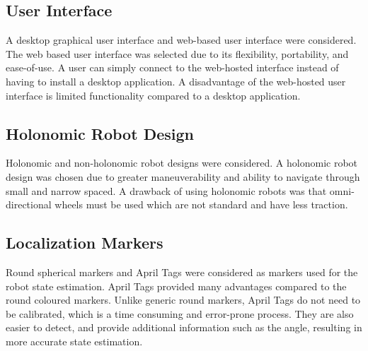\documentclass[12pt, titlepage]{article}
\begin{document}
\begin{enumerate}
\subsection{User Interface}
A desktop graphical user interface and web-based user interface were considered. The web based user interface was selected due to its flexibility, portability, and ease-of-use. A user can simply connect to the web-hosted interface instead of having to install a desktop application. A disadvantage of the web-hosted user interface is limited functionality compared to a desktop application.
  
\subsection{Holonomic Robot Design}
Holonomic and non-holonomic robot designs were considered. A holonomic robot design was chosen due to greater maneuverability and ability to navigate through small and narrow spaced. A drawback of using holonomic robots was that omni-directional wheels must be used which are not standard and have less traction.
  
\subsection{Localization Markers}
Round spherical markers and April Tags \cite{olson2011tags} were considered as markers used for the robot state estimation. April Tags provided many advantages compared to the round coloured markers. Unlike generic round markers, April Tags do not need to be calibrated, which is a time consuming and error-prone process. They are also easier to detect, and provide additional information such as the angle, resulting in more accurate state estimation.\\
  
  
\end{enumerate}
\end{document}
